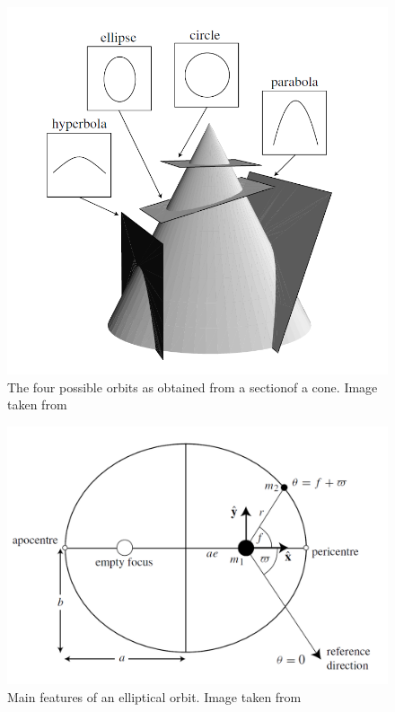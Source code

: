 \documentclass[12pt,%
               a4paper,%
               oneside,openany,%
               titlepage,%
               headinclude,footinclude,%
               BCOR5mm,%
               cleardoublepage=empty,%
               tablecaptionabove,%
               floatperchapter,
               ]{scrreprt}                 %
\begin{document}
\begin{figure}[h]
\begin{center}
\includegraphics[width=1\textwidth]{Figures/Conics.png}
\caption{The four possible orbits as obtained from a sectionof a cone. Image taken from \cite{murray1999solar}}
\label{Conics}
\end{center}
\end{figure}

\begin{figure}[h]
\begin{center}
\includegraphics[width=1\textwidth]{Figures/Elliptical_orbit.png}
\caption{Main features of an elliptical orbit. Image taken from \cite{murray1999solar}}
\label{Elliptical_orbit}
\end{center}
\end{figure}
\end{document}
